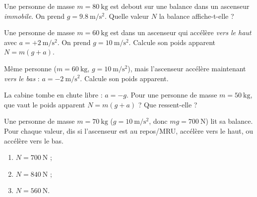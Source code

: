 \documentclass[11pt,a4paper]{article}
\begin{document}

\begin{exo}
Une personne de masse $m=\qty{80}{\kilogram}$ est debout sur une balance dans un
ascenseur \emph{immobile}. On prend $g=\qty{9.8}{\metre\per\second\squared}$.
Quelle valeur $N$ la balance affiche-t-elle ?
\end{exo}

\begin{exo}
Une personne de masse $m=\qty{60}{\kilogram}$ est dans un ascenseur qui accélère
\emph{vers le haut} avec $a=+\qty{2}{\metre\per\second\squared}$. On prend
$g=\qty{10}{\metre\per\second\squared}$. Calcule son poids apparent $N=m(g+a)$.
\end{exo}

\begin{exo}
Même personne ($m=\qty{60}{\kilogram}$, $g=\qty{10}{\metre\per\second\squared}$), mais
l'ascenseur accélère maintenant \emph{vers le bas} : $a=-\qty{2}{\metre\per\second\squared}$.
Calcule son poids apparent.
\end{exo}

\begin{exo}
La cabine tombe en chute libre : $a=-g$. Pour une personne de masse
$m=\qty{50}{\kilogram}$, que vaut le poids apparent $N=m(g+a)$ ? Que ressent-elle ?
\end{exo}

\begin{exo}
Une personne de masse $m=\qty{70}{\kilogram}$ ($g=\qty{10}{\metre\per\second\squared}$,
donc $mg=\qty{700}{\newton}$) lit sa balance. Pour chaque valeur, dis si l'ascenseur
est au repos/MRU, accélère vers le haut, ou accélère vers le bas.
\begin{enumerate}[label=\alph*)]
  \item $N=\qty{700}{\newton}$ ;
  \item $N=\qty{840}{\newton}$ ;
  \item $N=\qty{560}{\newton}$.
\end{enumerate}
\end{exo}
\end{document}
